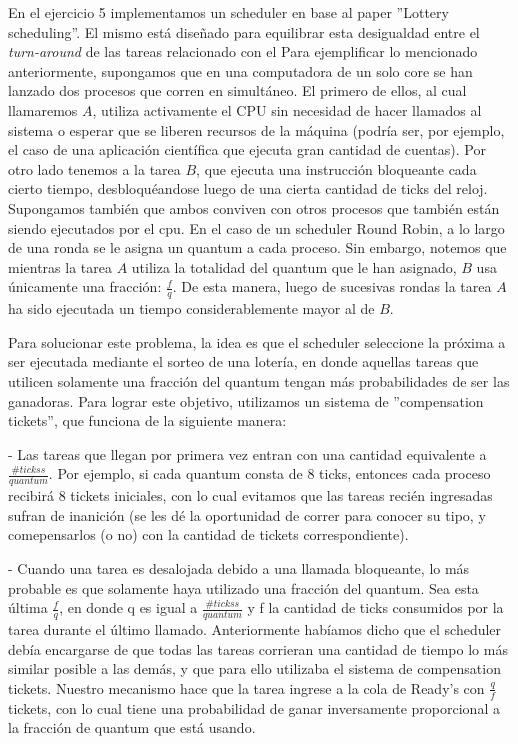 En el ejercicio 5 implementamos un scheduler en base al paper ''Lottery scheduling''. El mismo está diseñado para equilibrar esta desigualdad entre el \emph{turn-around} de las tareas relacionado con el
Para ejemplificar lo mencionado anteriormente, supongamos que en una computadora de un solo core se han lanzado dos procesos que corren en simultáneo. El primero de ellos, al cual llamaremos $A$, utiliza
activamente el CPU sin necesidad de hacer llamados al sistema o esperar que se liberen recursos de la máquina (podría ser, por ejemplo, el caso de una aplicación científica que ejecuta gran cantidad de 
cuentas). Por otro lado tenemos a la tarea $B$, que ejecuta una instrucción bloqueante cada cierto tiempo, desbloquéandose luego de una cierta cantidad de ticks del reloj. Supongamos también que ambos conviven
con otros procesos que también están siendo ejecutados por el cpu. En el caso de un scheduler Round Robin, a lo largo de una ronda se le asigna un quantum a cada proceso. Sin embargo, notemos que mientras
la tarea $A$ utiliza la totalidad del quantum que le han asignado, $B$ usa únicamente una fracción: $\frac{f}{q}$. De esta manera, luego de sucesivas rondas la tarea $A$ ha sido ejecutada un tiempo
considerablemente mayor al de $B$.

Para solucionar este problema, la idea es que el scheduler seleccione la próxima a ser ejecutada mediante el sorteo de una lotería, en donde aquellas tareas que utilicen solamente una fracción del quantum
tengan más probabilidades de ser las ganadoras. Para lograr este objetivo, utilizamos un sistema de ''compensation tickets'', que funciona de la siguiente manera:

- Las tareas que llegan por primera vez entran con una cantidad equivalente a $\frac{\#tickss}{quantum}$. Por ejemplo, si cada quantum consta de 8 ticks, entonces cada
proceso recibirá 8 tickets iniciales, con lo cual evitamos que las tareas recién ingresadas sufran de inanición (se les dé la oportunidad de correr para conocer su tipo, 
y comepensarlos (o no) con la cantidad de tickets correspondiente).

- Cuando una tarea es desalojada debido a una llamada bloqueante, lo más probable es que solamente haya utilizado una fracción del quantum. Sea esta última $\frac{f}{q}$,
en donde q es igual a $\frac{\#tickss}{quantum}$ y f la cantidad de ticks consumidos por la tarea durante el último llamado.
Anteriormente habíamos dicho que el scheduler debía encargarse de que todas las tareas corrieran una cantidad de tiempo lo más similar posible a las demás, y que para ello utilizaba
el sistema de compensation tickets. Nuestro mecanismo hace que la tarea ingrese a la cola de Ready's con $\frac{q}{f}$ tickets, con lo cual tiene una probabilidad de ganar
inversamente proporcional a la fracción de quantum que está usando.


